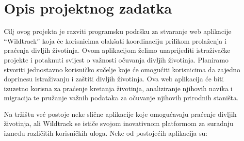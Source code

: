 \chapter{Opis projektnog zadatka}
		
		
		
		
		Cilj ovog projekta je razviti programsku podršku za stvaranje web aplikacije “Wildtrack” koja će korisnicima olakšati koordinaciju prilikom prolaženja i praćenja divljih životinja. Ovom aplikacijom želimo unaprijediti istraživačke projekte i potaknuti svijest o važnosti očuvanja divljih životinja. Planiramo stvoriti jednostavno korisničko sučelje koje će omogućiti korisnicima da zajedno doprinesu istraživanju i zaštiti divljih životinja. Ova web aplikacija će biti izuzetno korisna za praćenje kretanja životinja, analiziranje njihovih navika i migracija te pružanje važnih podataka za očuvanje njihovih prirodnih staništa.\newline
		
		Na tržištu već postoje neke slične aplikacije koje omogućavaju praćenje divljih životinja, ali Wildtrack se ističe svojom inovativnom platformom za suradnju između različitih korisničkih uloga. Neke od postojećih aplikacija su:
		
